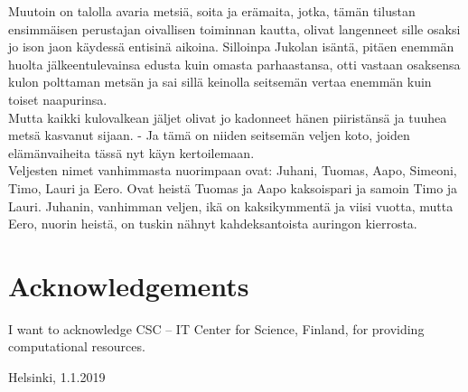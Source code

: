 \documentclass[12pt, a4paper, oneside]{article}
\begin{document}
\begin{small}
\begin{finnish}
\begin{minipage}{\textwidth}
{                Muutoin on talolla avaria metsiä, soita ja erämaita, jotka, tämän tilustan ensimmäisen perustajan oivallisen toiminnan kautta,
                olivat langenneet sille osaksi jo ison jaon käydessä entisinä aikoina.
                Silloinpa Jukolan isäntä, pitäen enemmän huolta jälkeentulevainsa edusta kuin omasta parhaastansa,
                otti vastaan osaksensa kulon polttaman metsän ja sai sillä keinolla seitsemän vertaa enemmän kuin toiset naapurinsa. \\

                Mutta kaikki kulovalkean jäljet olivat jo kadonneet hänen piiristänsä ja tuuhea metsä kasvanut sijaan.
                - Ja tämä on niiden seitsemän veljen koto, joiden elämänvaiheita tässä nyt käyn kertoilemaan. \\

                Veljesten nimet vanhimmasta nuorimpaan ovat: Juhani, Tuomas, Aapo, Simeoni, Timo, Lauri ja Eero.
                Ovat heistä Tuomas ja Aapo kaksoispari ja samoin Timo ja Lauri. Juhanin, vanhimman veljen,
                ikä on kaksikymmentä ja viisi vuotta, mutta Eero, nuorin heistä,
                on tuskin nähnyt kahdeksantoista auringon kierrosta.
            }
        \end{minipage}
    \end{finnish}
\end{small}

\clearpage


\normalsize
\onehalfspacing
\restoregeometry

\section*{Acknowledgements} \label{sec:acknowledgements}

I want to acknowledge CSC -- IT Center for Science, Finland, for providing computational resources.

\vspace{1cm}
\begin{FlushRight}
    Helsinki, 1.1.2019 \par
    \thesisauthor
\end{FlushRight}

\clearpage
\end{document}
